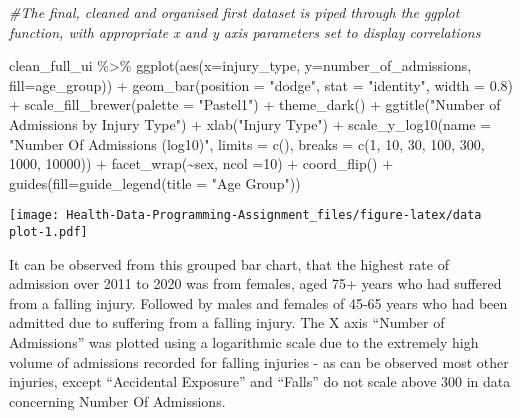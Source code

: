 \documentclass[
]{article}
\newenvironment{Shaded}{\begin{snugshade}}{\end{snugshade}}
\newcommand{\AttributeTok}[1]{\textcolor[rgb]{0.77,0.63,0.00}{#1}}
\newcommand{\CommentTok}[1]{\textcolor[rgb]{0.56,0.35,0.01}{\textit{#1}}}
\newcommand{\DecValTok}[1]{\textcolor[rgb]{0.00,0.00,0.81}{#1}}
\newcommand{\FloatTok}[1]{\textcolor[rgb]{0.00,0.00,0.81}{#1}}
\newcommand{\FunctionTok}[1]{\textcolor[rgb]{0.00,0.00,0.00}{#1}}
\newcommand{\NormalTok}[1]{#1}
\newcommand{\SpecialCharTok}[1]{\textcolor[rgb]{0.00,0.00,0.00}{#1}}
\newcommand{\StringTok}[1]{\textcolor[rgb]{0.31,0.60,0.02}{#1}}
\begin{document}
\begin{Shaded}
\begin{Highlighting}[]
\CommentTok{\#The final, cleaned and organised first dataset is piped through the ggplot function, with appropriate x and y axis parameters set to display correlations }

\NormalTok{clean\_full\_ui }\SpecialCharTok{\%\textgreater{}\%} 
  \FunctionTok{ggplot}\NormalTok{(}\FunctionTok{aes}\NormalTok{(}\AttributeTok{x=}\NormalTok{injury\_type, }\AttributeTok{y=}\NormalTok{number\_of\_admissions,  }\AttributeTok{fill=}\NormalTok{age\_group)) }\SpecialCharTok{+} 
  \FunctionTok{geom\_bar}\NormalTok{(}\AttributeTok{position =} \StringTok{"dodge"}\NormalTok{, }
        \AttributeTok{stat =} \StringTok{"identity"}\NormalTok{,}
        \AttributeTok{width =} \FloatTok{0.8}\NormalTok{) }\SpecialCharTok{+}
  \FunctionTok{scale\_fill\_brewer}\NormalTok{(}\AttributeTok{palette =} \StringTok{"Pastel1"}\NormalTok{) }\SpecialCharTok{+}
  \FunctionTok{theme\_dark}\NormalTok{() }\SpecialCharTok{+}
  \FunctionTok{ggtitle}\NormalTok{(}\StringTok{"Number of Admissions by Injury Type"}\NormalTok{) }\SpecialCharTok{+}
  \FunctionTok{xlab}\NormalTok{(}\StringTok{"Injury Type"}\NormalTok{) }\SpecialCharTok{+}
  \FunctionTok{scale\_y\_log10}\NormalTok{(}\AttributeTok{name =} \StringTok{"Number Of Admissions (log10)"}\NormalTok{, }
          \AttributeTok{limits =} \FunctionTok{c}\NormalTok{(),  }
          \AttributeTok{breaks =} \FunctionTok{c}\NormalTok{(}\DecValTok{1}\NormalTok{, }\DecValTok{10}\NormalTok{, }\DecValTok{30}\NormalTok{, }\DecValTok{100}\NormalTok{, }\DecValTok{300}\NormalTok{, }\DecValTok{1000}\NormalTok{, }\DecValTok{10000}\NormalTok{)) }\SpecialCharTok{+}
  \FunctionTok{facet\_wrap}\NormalTok{(}\SpecialCharTok{\textasciitilde{}}\NormalTok{sex, }\AttributeTok{ncol =}\DecValTok{10}\NormalTok{) }\SpecialCharTok{+}
  \FunctionTok{coord\_flip}\NormalTok{() }\SpecialCharTok{+}
  \FunctionTok{guides}\NormalTok{(}\AttributeTok{fill=}\FunctionTok{guide\_legend}\NormalTok{(}\AttributeTok{title =} \StringTok{"Age Group"}\NormalTok{)) }
\end{Highlighting}
\end{Shaded}

\texttt{[image: Health-Data-Programming-Assignment\_files/figure-latex/data plot-1.pdf]}

It can be observed from this grouped bar chart, that the highest rate of
admission over 2011 to 2020 was from females, aged 75+ years who had
suffered from a falling injury. Followed by males and females of 45-65
years who had been admitted due to suffering from a falling injury. The
X axis ``Number of Admissions'' was plotted using a logarithmic scale
due to the extremely high volume of admissions recorded for falling
injuries - as can be observed most other injuries, except ``Accidental
Exposure'' and ``Falls'' do not scale above 300 in data concerning
Number Of Admissions.
\end{document}
